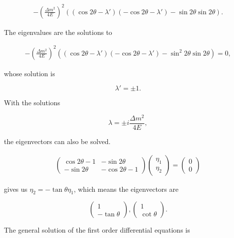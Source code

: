 \documentclass{tufte-handout}
\begin{document}
\begin{align*}
- \left( \frac{\Delta m^2}{4E} \right)^2   ( (\cos 2\theta - \lambda')(-\cos 2\theta - \lambda') - \sin 2\theta \sin 2\theta ) .
\end{align*}

The eigenvalues are the solutions to

\begin{align*}
- \left( \frac{\Delta m^2}{4E} \right)^2   ( (\cos 2\theta - \lambda')(-\cos 2\theta - \lambda') - \sin^2 2\theta \sin 2\theta ) =0 ,
\end{align*}

whose solution is

\begin{equation*}
\lambda' = \pm 1.
\end{equation*}


With the solutions

\begin{equation*}
\lambda = \pm i \frac{\Delta m^2}{4E},
\end{equation*}

the eigenvectors can also be solved.

\begin{align*}
\begin{pmatrix}
\cos 2\theta - 1 &  -  \sin 2\theta \\  - \sin 2\theta & - \cos 2\theta -1 
\end{pmatrix} \begin{pmatrix}
\eta_1 \\ \eta_2
\end{pmatrix} = \begin{pmatrix}
0 \\ 0
\end{pmatrix}
\end{align*}

gives us $\eta_2 = -\tan \theta \eta_1$, which means the eigenvectors are

\begin{equation}
\begin{pmatrix}
1 \\ -\tan\theta
\end{pmatrix} , \begin{pmatrix}
1 \\ \cot \theta
\end{pmatrix}.
\end{equation}

The general solution of the first order differential equations is
\end{document}
